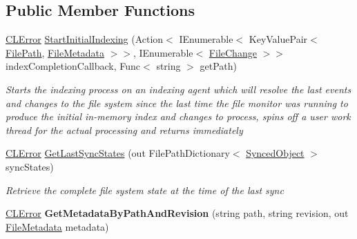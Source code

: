 \subsection*{Public Member Functions}
\begin{DoxyCompactItemize}
\item 
\hyperlink{class_cloud_api_public_1_1_model_1_1_c_l_error}{C\-L\-Error} \hyperlink{class_s_q_l_indexer_1_1_indexing_agent_ad2d6710dde71ef03a1df6790ec05efbb}{Start\-Initial\-Indexing} (Action$<$ I\-Enumerable$<$ Key\-Value\-Pair$<$ \hyperlink{class_cloud_api_public_1_1_model_1_1_file_path}{File\-Path}, \hyperlink{class_cloud_api_public_1_1_model_1_1_file_metadata}{File\-Metadata} $>$$>$, I\-Enumerable$<$ \hyperlink{class_cloud_api_public_1_1_model_1_1_file_change}{File\-Change} $>$$>$ index\-Completion\-Callback, Func$<$ string $>$ get\-Path)
\begin{DoxyCompactList}\small\item\em Starts the indexing process on an indexing agent which will resolve the last events and changes to the file system since the last time the file monitor was running to produce the initial in-\/memory index and changes to process, spins off a user work thread for the actual processing and returns immediately \end{DoxyCompactList}\item 
\hyperlink{class_cloud_api_public_1_1_model_1_1_c_l_error}{C\-L\-Error} \hyperlink{class_s_q_l_indexer_1_1_indexing_agent_a478bbca60eef0a27fd51cae58e97f449}{Get\-Last\-Sync\-States} (out File\-Path\-Dictionary$<$ \hyperlink{class_s_q_l_indexer_1_1_synced_object}{Synced\-Object} $>$ sync\-States)
\begin{DoxyCompactList}\small\item\em Retrieve the complete file system state at the time of the last sync \end{DoxyCompactList}\item 
\hypertarget{class_s_q_l_indexer_1_1_indexing_agent_a8703b7fb5c325aae121a3af475b59d3e}{\hyperlink{class_cloud_api_public_1_1_model_1_1_c_l_error}{C\-L\-Error} {\bfseries Get\-Metadata\-By\-Path\-And\-Revision} (string path, string revision, out \hyperlink{class_cloud_api_public_1_1_model_1_1_file_metadata}{File\-Metadata} metadata)}\label{class_s_q_l_indexer_1_1_indexing_agent_a8703b7fb5c325aae121a3af475b59d3e}


\end{DoxyCompactItemize}
